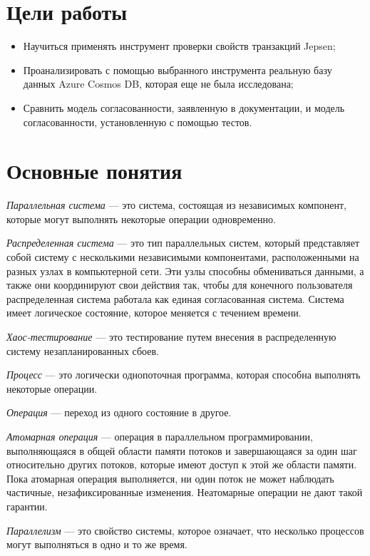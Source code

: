 \documentclass[12pt,  openany]{book}
\begin{document}
\section{Цели работы}
\begin{itemize}
  \item Научиться применять инструмент проверки свойств транзакций Jepsen;
  \item Проанализировать с помощью выбранного инструмента реальную базу данных Azure Cosmos DB, которая еще не была исследована;
  \item Сравнить модель согласованности, заявленную в документации, и модель согласованности, установленную с помощью тестов.
\end{itemize}

\section{Основные понятия}

\emph{Параллельная система} --- это система, состоящая из независимых компонент, которые могут выполнять некоторые операции одновременно.

\emph{Распределенная система} --- это тип параллельных систем, который представляет собой систему с несколькими независимыми компонентами, расположенными на разных узлах в компьютерной сети. Эти узлы способны обмениваться данными, а также они координируют свои действия так, чтобы для конечного пользователя распределенная система работала как единая согласованная система. Система имеет логическое состояние, которое меняется с течением времени.

\emph{Хаос-тестирование \cite{chaosTesting}} --- это тестирование путем внесения в распределенную систему незапланированных сбоев.

\emph{Процесс} --- это логически однопоточная программа, которая способна выполнять некоторые операции.

\emph{Операция} --- переход из одного состояние в другое.

\emph{Атомарная операция} --- \cite{habrAtomicOperation} операция в параллельном программировании, выполняющаяся в общей области памяти потоков и завершающаяся за один шаг относительно других потоков, которые имеют доступ к этой же области памяти.  Пока атомарная операция выполняется, ни один поток не может наблюдать частичные, незафиксированные изменения. Неатомарные операции не дают такой гарантии. 

\emph{Параллелизм} --- это свойство системы, которое означает, что несколько процессов могут выполняться в одно и то же время.
\end{document}
